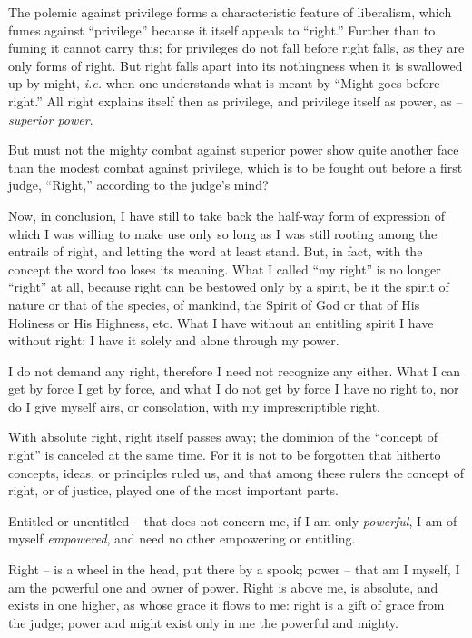 The polemic against privilege forms a characteristic feature of liberalism, 
which fumes against ``privilege'' because it itself appeals to ``right.'' 
Further than to fuming it cannot carry this; for privileges do not fall before 
right falls, as they are only forms of right. But right falls apart into its 
nothingness when it is swallowed up by might, \textit{i.e.} when one 
understands what is meant by ``Might goes before right.'' All right explains 
itself then as privilege, and privilege itself as power, as -- 
\textit{superior power}.

But must not the mighty combat against superior power show quite another face 
than the modest combat against privilege, which is to be fought out before a 
first judge, ``Right,'' according to the judge's mind?

\myhrule


Now, in conclusion, I have still to take back the half-way form of expression 
of which I was willing to make use only so long as I was still rooting among 
the entrails of right, and letting the word at least stand. But, in fact, with 
the concept the word too loses its meaning. What I called ``my right'' is no 
longer ``right'' at all, because right can be bestowed only by a spirit, be 
it the spirit of nature or that of the species, of mankind, the Spirit of God 
or that of His Holiness or His Highness, etc. What I have without an entitling 
spirit I have without right; I have it solely and alone through my power.

I do not demand any right, therefore I need not recognize any either. What I 
can get by force I get by force, and what I do not get by force I have no 
right to, nor do I give myself airs, or consolation, with my imprescriptible 
right.

With absolute right, right itself passes away; the dominion of the ``concept 
of right'' is canceled at the same time. For it is not to be forgotten that 
hitherto concepts, ideas, or principles ruled us, and that among these rulers 
the concept of right, or of justice, played one of the most important parts.

Entitled or unentitled -- that does not concern me, if I am only 
\textit{powerful}, I am of myself \textit{empowered}, and need no other 
empowering or entitling.

Right -- is a wheel in the head, put there by a spook; power -- that am I 
myself, I am the powerful one and owner of power. Right is above me, is 
absolute, and exists in one higher, as whose grace it flows to me: right is a 
gift of grace from the judge; power and might exist only in me the powerful 
and mighty.

